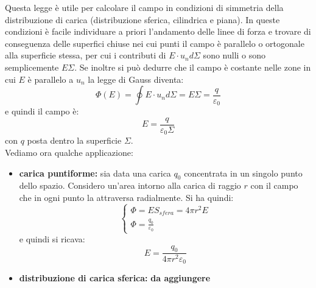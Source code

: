 \documentclass[a4paper,12pt, oneside]{book}
\begin{document}
Questa legge è utile per calcolare il campo in condizioni di simmetria della distribuzione di carica (distribuzione sferica, cilindrica e piana). In queste condizioni è facile individuare a priori l'andamento delle linee di forza e trovare di conseguenza delle superfici chiuse nei cui punti il campo è parallelo o ortogonale alla superficie stessa, per cui i contributi di $E\cdot u_nd\Sigma$ sono nulli o sono semplicemente $E\Sigma$. Se inoltre si può dedurre che il campo è costante nelle zone in cui $E$ è parallelo a $u_n$ la legge di Gauss diventa:
$$\Phi(E)=\oint E\cdot u_nd\Sigma=E\Sigma=\frac{q}{\varepsilon_0}$$
e quindi il campo è:
$$E=\frac{q}{\varepsilon_0\Sigma}$$
con $q$ posta dentro la superficie $\Sigma$.\\
Vediamo ora qualche applicazione:
\begin{itemize}
\item \textbf{carica puntiforme:} sia data una carica $q_0$ concentrata in un singolo punto dello spazio. Considero un'area intorno alla carica di raggio $r$ con il campo che in ogni punto la attraversa radialmente. Si ha quindi:
$$
\begin{cases}
\Phi=ES_{sfera}=4\pi r^2 E\\
\Phi=\frac{q_0}{\varepsilon_0}
\end{cases}
$$
e quindi si ricava:
$$E=\frac{q_0}{4\pi r^2 \varepsilon_0}$$
\item \textbf{distribuzione di carica sferica:}  \textbf{da aggiungere}

\end{itemize}
\end{document}
